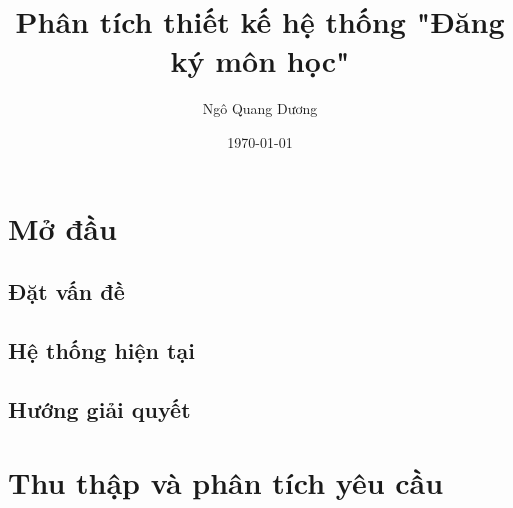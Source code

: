 \documentclass{article}
\title{\textbf{Phân tích thiết kế hệ thống "Đăng ký môn học"}}
\author{
  Ngô Quang Dương
}
\date{\today}
\begin{document}
\maketitle

\begin{abstract}
\end{abstract}

\tableofcontents

\section{Mở đầu}

  \subsection{Đặt vấn đề}

  \subsection{Hệ thống hiện tại}

  \subsection{Hướng giải quyết}

\section{Thu thập và phân tích yêu cầu}
  
\end{document}
